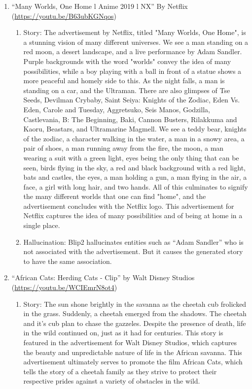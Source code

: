 \begin{enumerate}
    \item ``Many Worlds, One Home l Anime 2019 l NX'' By Netflix (\url{https://youtu.be/B63ubKGNqos}) 
    \begin{enumerate}
        \item Story: The advertisement by Netflix, titled "Many Worlds, One Home", is a stunning vision of many different universes. We see a man standing on a red moon, a desert landscape, and a live performance by Adam Sandler. Purple backgrounds with the word "worlds" convey the idea of many possibilities, while a boy playing with a ball in front of a statue shows a more peaceful and homely side to this. As the night falls, a man is standing on a car, and the Ultraman. There are also glimpses of Tse Seeds, Devilman Crybaby, Saint Seiya: Knights of the Zodiac, Eden Vs. Eden, Carole and Tuesday, Aggretsuko, Seis Manos, Godzilla, Castlevania, B: The Beginning, Baki, Cannon Busters, Rilakkuma and Kaoru, Beastars, and Ultramarine Magmell. We see a teddy bear, knights of the zodiac, a character walking in the water, a man in a snowy area, a pair of shoes, a man running away from the fire, the moon, a man wearing a suit with a green light, eyes being the only thing that can be seen, birds flying in the sky, a red and black background with a red light, bats and castles, the eyes, a man holding a gun, a man flying in the air, a face, a girl with long hair, and two hands. All of this culminates to signify the many different worlds that one can find "home", and the advertisement concludes with the Netflix logo. This advertisement for Netflix captures the idea of many possibilities and of being at home in a single place.
        
        \item Hallucination: Blip2 hallucinates entities such as ``Adam Sandler'' who is not associated with the advertisement. But it causes the generated story to have the same association.
    \end{enumerate}
    
    

    \item ``African Cats: Herding Cats - Clip'' by Walt Disney Studios (\url{https://youtu.be/WCIEmrN8ot4}) 
    \begin{enumerate}
        \item Story: The sun shone brightly in the savanna as the cheetah cub frolicked in the grass. Suddenly, a cheetah emerged from the shadows. The cheetah and it's cub plan to chase the gazzeles. Despite the presence of death, life in the wild continued on, just as it had for centuries. This story is featured in the advertisement for Walt Disney Studios, which captures the beauty and unpredictable nature of life in the African savanna. This advertisement ultimately serves to promote the film African Cats, which tells the story of a cheetah family as they strive to protect their respective prides against a variety of obstacles in the wild.
        

\end{enumerate}
\end{enumerate}
